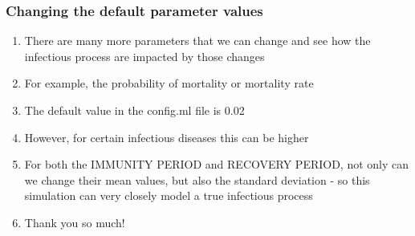 \documentclass{beamer}
\begin{document}
\frame
{
\frametitle{Changing the default parameter values}

\begin{enumerate}
\item There are many more parameters that we can change and see how the infectious process are impacted by those changes
\item For  example, the probability of mortality or mortality rate
\item The default value in the config.ml file is 0.02
\item However, for certain infectious diseases this can be higher
\item For both the IMMUNITY PERIOD and RECOVERY PERIOD, not only can we change their mean values, but also the standard deviation - so this simulation can very closely model a true infectious process
\item Thank you so much!
\end{enumerate}



}
 
\end{document}
